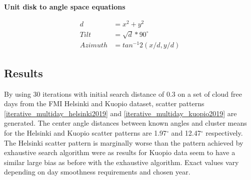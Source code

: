 \noindent \textbf{Unit disk to angle space equations}

\begin{equation}
\begin{split}
\label{unit_circle_to_angle_space}
d &= x^2+y^2\\
Tilt &= \sqrt{d}*90^\circ\\
Azimuth &= tan^{-1}2(x/d, y/d)
\end{split}
\end{equation}

\pagebreak

\subsection{Results}
By using 30 iterations with initial search distance of 0.3 on a set of cloud free days from the FMI Helsinki and Kuopio dataset, scatter patterns \ref{iterative_multiday_helsinki2019} and \ref{iterative_multiday_kuopio2019} are generated. The center angle distances between known angles and cluster means for the Helsinki and Kuopio scatter patterns are 1.97$^\circ$ and 12.47$^\circ$ respectively. The Helsinki scatter pattern is marginally worse than the pattern achieved by exhaustive search algorithm were as results for Kuopio data seem to have a similar large bias as before with the exhaustive algorithm. Exact values vary depending on day smoothness requirements and chosen year.


